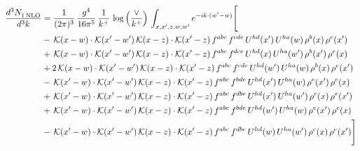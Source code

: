 \documentclass[9pt]{article}
\numberwithin{equation}{section}
\begin{document}
\begin{align}
\frac{d^{3}N_{1\,\rm NLO}^{\rm}}{d^{3}k}  & = \frac{1}{(2\pi)^{3}}\,\frac{g^{4}}{16\pi^{5}}\,\frac{1}{k^{+}}\,\log{\left(\frac{\vee}{k^{+}}\right)}\, \int_{x,x',z,w,w'}e^{-ik\cdot(w'-w)}\Bigg[\notag\\
&-\,\mathcal{K}(x-w)\cdot\mathcal{K}(x'-w')\,\mathcal{K}(x-z)\cdot\mathcal{K}(x'-z)\,f^{abc}\,f^{cde}\,U^{hd}(x')\,U^{ha}(w)\,\rho^{b}(x)\,\rho^{e}(x')\notag\\
&+\,\mathcal{K}(x-w)\cdot\mathcal{K}(x'-w')\,\mathcal{K}(x-z)\cdot\mathcal{K}(x'-z)\,f^{abc}\,f^{dce}\,U^{hd}(x)\,U^{ha}(w')\,\rho^{b}(x')\,\rho^{e}(x)\notag\\
&+2\,\mathcal{K}(x-w)\cdot\mathcal{K}(x'-w')\,\mathcal{K}(x-z)\cdot\mathcal{K}(x'-z)\,f^{abc}\,f^{cde}\,U^{hd}(w')\,U^{ha}(w)\,\rho^{b}(x)\,\rho^{e}(x')\notag\\
&-\,\mathcal{K}(x'-w)\cdot\mathcal{K}(x'-w')\,\mathcal{K}(x-z)\cdot\mathcal{K}(x'-z)\,f^{abc}\,f^{bde}\,U^{hd}(x')\,U^{ha}(w)\,\rho^{e}(x')\,\rho^{c}(x)\notag\\
&+\,\mathcal{K}(x'-w)\cdot\mathcal{K}(x'-w')\,\mathcal{K}(x-z)\cdot\mathcal{K}(x'-z)\,f^{abc}\,f^{dbe}\,U^{hd}(x')\,U^{ha}(w')\,\rho^{c}(x)\,\rho^{e}(x')\notag\\
&+\,\mathcal{K}(x'-w)\cdot\mathcal{K}(x'-w')\,\mathcal{K}(x-z)\cdot\mathcal{K}(x'-z)\,f^{abc}\,f^{bde}\,U^{hd}(w')\,U^{ha}(w)\,\rho^{e}(x')\,\rho^{c}(x)\notag\\
&-\,\mathcal{K}(x'-w)\cdot\mathcal{K}(x'-w')\,\mathcal{K}(x-z)\cdot\mathcal{K}(x'-z)\,f^{abc}\,f^{dbe}\,U^{hd}(w)\,U^{ha}(w')\,\rho^{c}(x)\,\rho^{e}(x')\Bigg]
\end{align}
\end{document}
